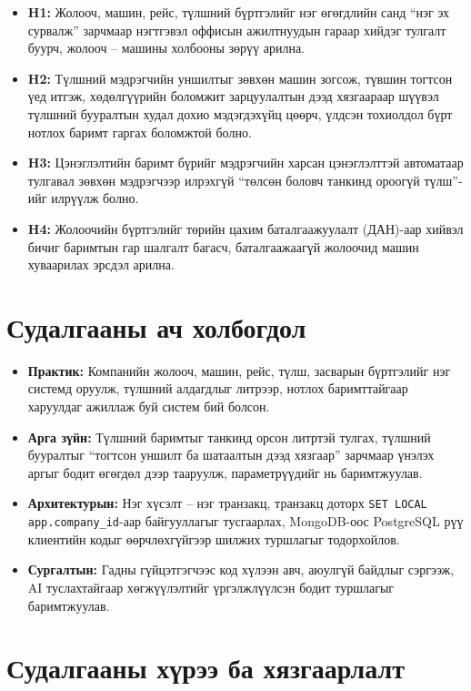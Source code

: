 \documentclass[
12pt,
oneside,
english,
onehalfspacing,
nolistspacing,
headsepline,
]{MUST-Thesis}
\begin{document}
\begin{itemize}
    \item \textbf{H1:} Жолооч, машин, рейс, түлшний бүртгэлийг нэг өгөгдлийн санд ``нэг эх сурвалж'' зарчмаар нэгтгэвэл оффисын ажилтнуудын гараар хийдэг тулгалт буурч, жолооч -- машины холбооны зөрүү арилна.
    \item \textbf{H2:} Түлшний мэдрэгчийн уншилтыг зөвхөн машин зогсож, түвшин тогтсон үед итгэж, хөдөлгүүрийн боломжит зарцуулалтын дээд хязгаараар шүүвэл түлшний бууралтын худал дохио мэдэгдэхүйц цөөрч, үлдсэн тохиолдол бүрт нотлох баримт гаргах боломжтой болно.
    \item \textbf{H3:} Цэнэглэлтийн баримт бүрийг мэдрэгчийн харсан цэнэглэлттэй автоматаар тулгавал зөвхөн мэдрэгчээр илрэхгүй ``төлсөн боловч танкинд ороогүй түлш''-ийг илрүүлж болно.
    \item \textbf{H4:} Жолоочийн бүртгэлийг төрийн цахим баталгаажуулалт (ДАН)-аар хийвэл бичиг баримтын гар шалгалт багасч, баталгаажаагүй жолоочид машин хуваарилах эрсдэл арилна.
\end{itemize}

\section{Судалгааны ач холбогдол}

\begin{itemize}
    \item \textbf{Практик:} Компанийн жолооч, машин, рейс, түлш, засварын бүртгэлийг нэг системд оруулж, түлшний алдагдлыг литрээр, нотлох баримттайгаар харуулдаг ажиллаж буй систем бий болсон.
    \item \textbf{Арга зүйн:} Түлшний баримтыг танкинд орсон литртэй тулгах, түлшний бууралтыг ``тогтсон уншилт ба шатаалтын дээд хязгаар'' зарчмаар үнэлэх аргыг бодит өгөгдөл дээр тааруулж, параметрүүдийг нь баримтжуулав.
    \item \textbf{Архитектурын:} Нэг хүсэлт -- нэг транзакц, транзакц доторх \texttt{SET LOCAL app.company\_id}-аар байгууллагыг тусгаарлах, MongoDB-оос PostgreSQL рүү клиентийн кодыг өөрчлөхгүйгээр шилжих туршлагыг тодорхойлов.
    \item \textbf{Сургалтын:} Гадны гүйцэтгэгчээс код хүлээн авч, аюулгүй байдлыг сэргээж, AI туслахтайгаар хөгжүүлэлтийг үргэлжлүүлсэн бодит туршлагыг баримтжуулав.
\end{itemize}

\section{Судалгааны хүрээ ба хязгаарлалт}
\end{document}
